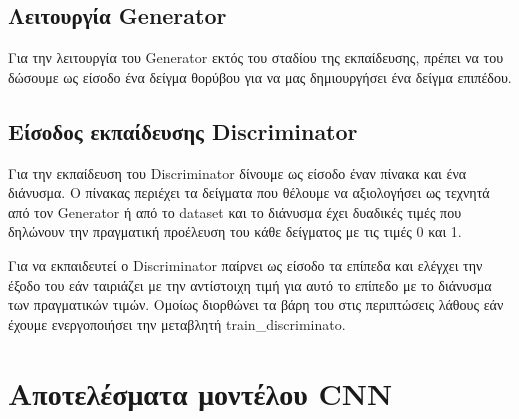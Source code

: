 \subsection{Λειτουργία Generator}
Για την λειτουργία του Generator εκτός του σταδίου της εκπαίδευσης, πρέπει να του δώσουμε ως είσοδο ένα δείγμα θορύβου για να μας δημιουργήσει ένα δείγμα επιπέδου.

\subsection{Είσοδος εκπαίδευσης Discriminator}
Για την εκπαίδευση του Discriminator δίνουμε ως είσοδο έναν πίνακα και ένα διάνυσμα. Ο πίνακας περιέχει τα δείγματα που θέλουμε να αξιολογήσει ως τεχνητά από τον Generator ή από το dataset και το διάνυσμα έχει δυαδικές τιμές που δηλώνουν την πραγματική προέλευση του κάθε δείγματος με τις τιμές 0 και 1.
\par
Για να εκπαιδευτεί ο Discriminator παίρνει ως είσοδο τα επίπεδα και ελέγχει την έξοδο του εάν ταιριάζει με την αντίστοιχη τιμή για αυτό το επίπεδο με το διάνυσμα των πραγματικών τιμών. Ομοίως διορθώνει τα βάρη του στις περιπτώσεις λάθους εάν έχουμε ενεργοποιήσει την μεταβλητή train\_discriminato.


\section{Αποτελέσματα μοντέλου CNN}

